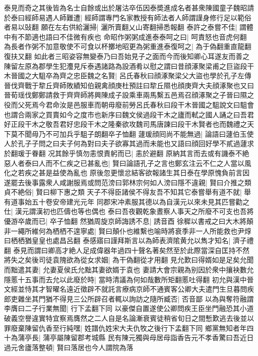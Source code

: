 泰見而奇之其後皆為名士自餘或出於屠沽卒伍因泰奬進成名者甚衆陳國童子魏昭請於泰曰經師易遇人師難遭|{
	經師謂專門名家教授有師法者人師謂謹身修行足以範俗者易以䜴翻}
願在左右供給灑掃|{
	灑所賣翻乂山寄翻掃悉報翻}
泰許之泰嘗不佳|{
	謂體中有不節適也語曰不佳微有疾也}
命昭作粥粥成進泰泰呵之曰|{
	呵責怒也音虎何翻}
為長者作粥不加意敬使不可食以杯擲地昭更為粥重進泰復呵之|{
	為于偽翻重直龍翻復扶又翻}
如此者三昭姿容無變泰乃曰吾始見子之面而今而後知卿心耳遂友而善之陳留左原為郡學生犯灋見斥泰遇諸路為設酒肴以慰之謂曰昔顔涿聚梁甫之巨盜段干木晉國之大駔卒為齊之忠臣魏之名賢|{
	呂氏春秋曰顔涿聚梁父大盜也學於孔子左傳晉伐齊戰于犂丘齊師敗績知伯親禽顔庚杜預註曰犂丘隰也顔庚齊大夫顔涿聚也又曰晉荀瑶伐鄭鄭請救于齊齊師將興陳成子設乘車兩馬繫五邑焉召顔涿聚之子晉曰隰之役而父死焉今君命汝是邑服車而朝毋廢前勞呂氏春秋曰段干木晉國之駔說文曰駔會也謂合兩家之買賣如今之度市也新序曰魏文侯過段干木之廬而軾之國人誦之曰吾君好正段干木之敬吾君好忠段干木之隆秦欲攻魏司馬唐諫曰段干木賢者也而魏禮之天下莫不聞毋乃不可加兵乎駔子朗翻卒子恤翻}
蘧瑗顔囘尚不能無過|{
	論語曰蘧伯玉使人於孔子子問之曰夫子何為對曰夫子欲寡其過而未能也又語曰顔回好學不貳過蘧求於翻瑗于眷翻}
况其餘乎慎勿恚恨責躬而已|{
	恚於避翻}
原納其言而去或有譏泰不絶惡人者泰曰人而不仁疾之已甚亂也|{
	賢曰論語孔子之言也鄭玄注云不仁之人當以風化之若疾之甚是益使為亂也}
原後忽更懷忿結客欲報諸生其日泰在學原愧負前言因遂罷去後事露衆人咸謝服焉或問范滂曰郭林宗何如人滂曰隱不違親|{
	賢曰介推之類}
貞不絶俗|{
	賢曰柳下惠之類}
天子不得臣諸侯不得友吾不知其它泰嘗舉有道不就|{
	舉有道事始五十卷安帝建光元年}
同郡宋冲素服其德以為自漢元以來未見其匹嘗勸之仕|{
	漢元謂漢初也匹儔也等也偶也}
泰曰吾夜觀乾象晝察人事天之所廢不可支也吾將優游卒歲而已|{
	卒子恤翻}
然猶周旋京師誨誘不息|{
	誘音酉}
徐穉以書戒之曰大木將顛非一繩所維何為栖栖不遑寧處|{
	賢曰顛仆也維繫也喻時將衰季非一人所能救也尹焞曰栖栖猶皇皇也處昌呂翻}
泰感寤曰謹拜斯言以為師表濟隂黄允以雋才知名|{
	濟子禮翻}
泰見而謂曰卿高才絶人足成偉器年過四十聲名著矣然至於此際當深自匡持不然將失之矣後司徒袁隗欲為從女求姻|{
	為干偽翻從才用翻}
見允歎曰得婿如是足矣允聞而黜遣其妻|{
	允妻夏侯氏允黜其妻欲婿于袁也}
妻請大會宗親為别因於衆中攘袂數允隱慝十五事而去允以此廢於時|{
	當時清議為何如哉數所矩翻慝吐得翻}
初允與漢中晉文經並恃其才智曜名遠近徵辟不就託言療病京師不通賓客公卿大夫遣門生旦暮問疾郎吏雜坐其門猶不得見三公所辟召者輒以詢訪之隨所臧否|{
	否音鄙}
以為與奪符融謂李膺曰二子行業無聞|{
	行下孟翻下同}
以豪傑自置遂使公卿問疾王臣坐門融恐其小道破義空譽違實特宜察焉膺然之二人自是名論漸衰賓徒稍省旬日之間慙歎逃去後並以罪廢棄陳留仇香至行純嘿|{
	姓譜仇姓宋大夫仇牧之後行下孟翻下同}
鄉黨無知者年四十為蒲亭長|{
	蒲亭屬陳留郡考城縣}
民有陳元獨與母居母詣香告元不孝香驚曰吾近日過元舍廬落整頓|{
	賢曰落居也今人謂院為落}
